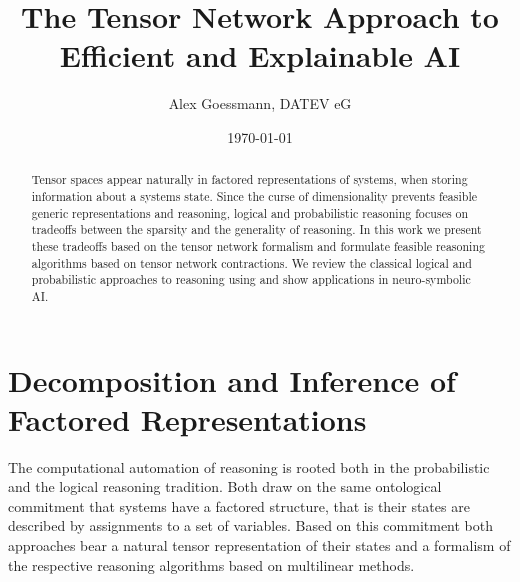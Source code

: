\documentclass[aps,onecolumn,nofootinbib,pra]{article}
\begin{document}
\title{The Tensor Network Approach to Efficient and Explainable AI}
\author{Alex Goessmann, DATEV eG}


\maketitle
\date{\today}

\begin{abstract}
	Tensor spaces appear naturally in factored representations of systems, when storing information about a systems state.
	Since the curse of dimensionality prevents feasible generic representations and reasoning, logical and probabilistic reasoning focuses on tradeoffs between the sparsity and the generality of reasoning.
	In this work we present these tradeoffs based on the tensor network formalism and formulate feasible reasoning algorithms based on tensor network contractions.
	We review the classical logical and probabilistic approaches to reasoning using and show applications in neuro-symbolic AI.
\end{abstract}	

\tableofcontents


\newcommand{\red}[1]{\textcolor{red}{#1}}




\part{Decomposition and Inference of Factored Representations}

The computational automation of reasoning is rooted both in the probabilistic and the logical reasoning tradition.
Both draw on the same ontological commitment that systems have a factored structure, that is their states are described by assignments to a set of variables.
Based on this commitment both approaches bear a natural tensor representation of their states and a formalism of the respective reasoning algorithms based on multilinear methods.








\end{document}
